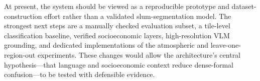 \documentclass[11pt,a4paper]{article}
\begin{document}
At present, the system should be viewed as a reproducible prototype and dataset-construction effort rather than a validated slum-segmentation model. The strongest next steps are a manually checked evaluation subset, a tile-level classification baseline, verified socioeconomic layers, high-resolution VLM grounding, and dedicated implementations of the atmospheric and leave-one-region-out experiments. These changes would allow the architecture's central hypothesis---that language and socioeconomic context reduce dense-formal confusion---to be tested with defensible evidence.



\end{document}
